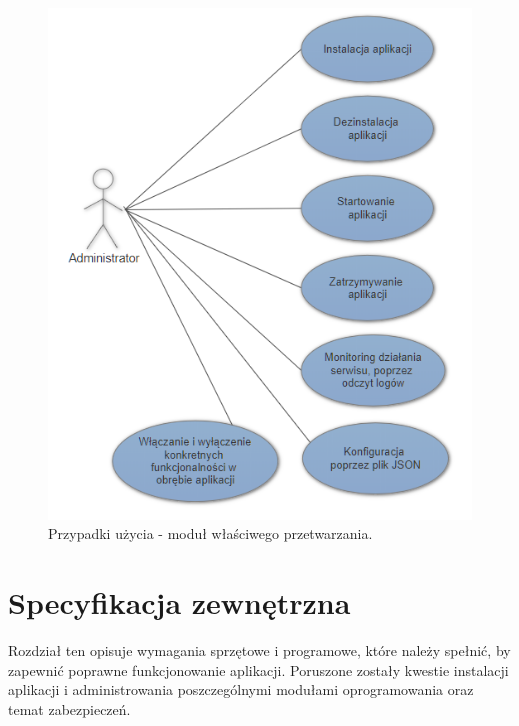 \documentclass[a4paper]{book}
\begin{document}
\begin{figure}[t]
	\centering
	\includegraphics{./img/przypadki_uzycia_parser.png}
	\caption{Przypadki użycia - moduł właściwego przetwarzania.}
	\label{fig:przypadki_uzycia_parser}
\end{figure}
\chapter{Specyfikacja zewnętrzna}
\label{rozdzial4}
Rozdział ten opisuje wymagania sprzętowe i programowe, które należy spełnić, by zapewnić poprawne funkcjonowanie aplikacji. Poruszone zostały kwestie instalacji aplikacji i administrowania poszczególnymi modułami oprogramowania oraz temat zabezpieczeń.
\end{document}
